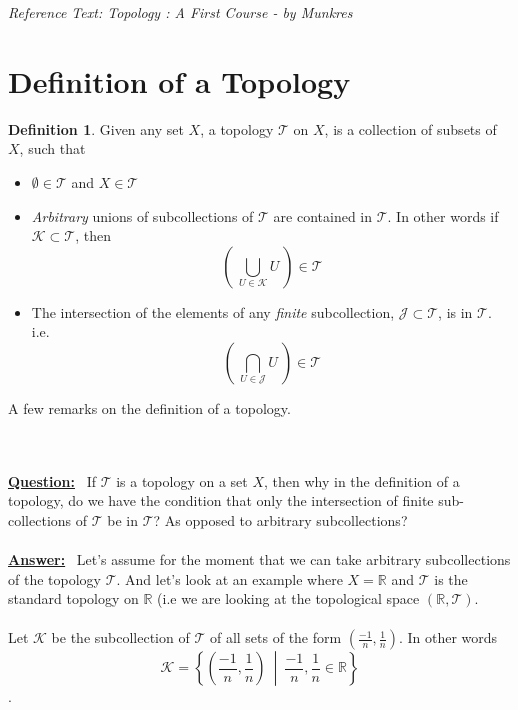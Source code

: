 \documentclass{article}
\theoremstyle{remark}
\theoremstyle{definition}
\newtheorem{definition}{Definition}[section]
\begin{document}
\begin{flushleft}
\textit{Reference Text: Topology : A First Course - by Munkres}

\end{flushleft}

\newpage

\section{Definition of a Topology}
\medskip
\begin{definition}
Given any set $X$, a topology $\mathcal{T}$ on $X$, is a collection of subsets of $X$, such that

\begin{itemize}
  \item $\emptyset \in \mathcal{T}$ and $X \in \mathcal{T}$
  \item \textit{Arbitrary} unions of subcollections of $\mathcal{T}$ are contained in $\mathcal{T}$. In other words if $\mathcal{K} \subset \mathcal{T}$, then $$\left( \ \bigcup_{U \in \mathcal{K}}U \ \right) \in \mathcal{T}$$
  \item The intersection of the elements of any \textit{finite} subcollection, $\mathcal{J} \subset \mathcal{T}$, is in $\mathcal{T}$. i.e. $$\left( \ \bigcap_{U \in \mathcal{J}}U \ \right) \in \mathcal{T}$$
\end{itemize}
\end{definition}

\medskip
\hrulefill
\begin{flushleft}
A few remarks on the definition of a topology. 
\end{flushleft}
\\ \\
\textbf{\underline{Question:}} 
\ If $\mathcal{T}$ is a topology on a set $X$, then why in the definition of a topology, do we have the condition that only the intersection of finite sub-collections of $\mathcal{T}$ be in $\mathcal{T}$? As opposed to arbitrary subcollections?
\\ \\
\textbf{\underline{Answer:}} 
\ Let's assume for the moment that we can take arbitrary subcollections of the topology $\mathcal{T}$. And let's look at an example where $X = \mathbb{R}$ and $\mathcal{T}$ is the standard topology on $\mathbb{R}$ (i.e we are looking at the topological space $(\mathbb{R}, \mathcal{T})$.
\\ \\
Let $\mathcal{K}$ be the subcollection of $\mathcal{T}$ of all sets of the form $(\frac{-1}{n}, \frac{1}{n})$. In other words $$\mathcal{K} = \left\{\left(\frac{-1}{n}, \frac{1}{n}\right) \ \middle| \ \frac{-1}{n}, \frac{1}{n} \in \mathbb{R}\right\}$$.
\end{document}
